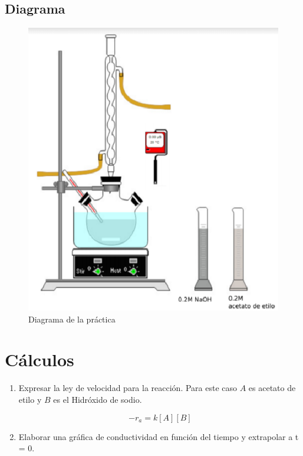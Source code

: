 \documentclass[12pt,letterpaper]{article}
\begin{document}
    \subsection{Diagrama}
        \begin{figure}[H]
            \centering
            \includegraphics[scale=0.7]{Figuras/Diagrama.eps}
            \caption{Diagrama de la pr\'{a}ctica}
        \end{figure}
%
%
%
\section{Cálculos}


\begin{enumerate}
        \item Expresar la ley de velocidad para la reacción.
         Para este caso $ A$ es acetato de etilo y $B$ es el Hidróxido de sodio.

                $$ -r_{a}= k[A][B] $$
        \item Elaborar una gráfica de conductividad en función del tiempo y extrapolar a t = 0.
\end{enumerate}
\end{document}
